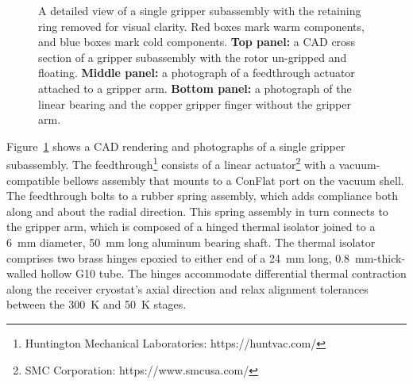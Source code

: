 \begin{figure}[!t]
    \centering
    \hfill
    \caption{A detailed view of a single gripper subassembly with the retaining ring removed for visual clarity. Red boxes mark warm components, and blue boxes mark cold components. \textbf{Top panel:} a CAD cross section of a gripper subassembly with the rotor un-gripped and floating.  \textbf{Middle panel:} a photograph of a feedthrough actuator attached to a gripper arm. \textbf{Bottom panel:} a photograph of the linear bearing and the copper gripper finger without the gripper arm.}
    \label{fig:gripper_assy}
\end{figure}

Figure~\ref{fig:gripper_assy} shows a CAD rendering and photographs of a single gripper subassembly. The feedthrough\footnote{Huntington Mechanical Laboratories: https://huntvac.com/} consists of a linear actuator\footnote{SMC Corporation: https://www.smcusa.com/} with a vacuum-compatible bellows assembly that mounts to a ConFlat port on the vacuum shell. The feedthrough bolts to a rubber spring assembly, which adds compliance both along and about the radial direction. This spring assembly in turn connects to the gripper arm, which is composed of a hinged thermal isolator joined to a 6~mm diameter, 50~mm long aluminum bearing shaft. The thermal isolator comprises two brass hinges epoxied to either end of a 24~mm long, 0.8~mm-thick-walled hollow G10 tube. The hinges accommodate differential thermal contraction along the receiver cryostat's axial direction and relax alignment tolerances between the 300~K and 50~K stages.

